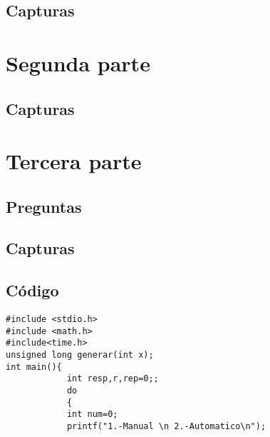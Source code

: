 \documentclass[12pt]{article}
\begin{document}
\subsection{Capturas}
\section{Segunda parte}
\subsection{Capturas}
\section{Tercera parte}
\subsection{Preguntas}
\subsection{Capturas}
\subsection{Código}
\lstset{language=C, breaklines=true, basicstyle=\footnotesize}
\begin{lstlisting}[frame=single]
#include <stdio.h>
#include <math.h>
#include<time.h> 
unsigned long generar(int x);
int main(){
            int resp,r,rep=0;;
			do
			{
			int num=0;
			printf("1.-Manual \n 2.-Automatico\n");
    
\end{lstlisting}
\end{document}
